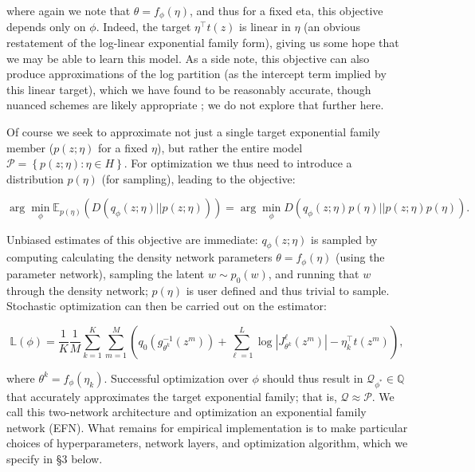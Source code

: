 \documentclass{article}
\begin{document}
where again we note that $\theta = f_\phi(\eta)$, and thus for a fixed eta, this objective depends only on $\phi$.  Indeed, the target $\eta^\top t(z)$ is linear in $\eta$ (an obvious restatement of the log-linear exponential family form), giving us some hope that we may be able to learn this model.  As a side note, this objective can also produce approximations of the log partition (as the intercept term implied by this linear target), which we have found to be reasonably accurate, though nuanced schemes are likely appropriate \cite{papamakarios2015distilling}; we do not explore that further here.

Of course we seek to approximate not just a single target exponential family member ($p(z;\eta)$ for a fixed $\eta$), but rather the entire model $\mathcal{P} = \left\{p(z;\eta): \eta \in H\right\}$.   For optimization we thus need to introduce a distribution $p(\eta)$ (for sampling), leading to the objective: 

$$\arg\!\min_{\!\!\!\!\!\!\!\!\!\!\!\phi} \mathbb{E}_{p(\eta)} \left( D\left( q_\phi(z;\eta) || p(z;\eta) \right)\right) =  \arg\!\min_{\!\!\!\!\!\!\!\!\!\!\!\phi}  D\left( q_\phi(z;\eta)p(\eta) || p(z;\eta)p(\eta) \right).$$

Unbiased estimates of this objective are immediate: $q_\phi(z;\eta)$ is sampled by computing calculating the density network parameters $\theta = f_\phi(\eta)$ (using the parameter network), sampling the latent $w \sim p_0(w)$, and running that $w$ through the density network; $p(\eta)$ is user defined and thus trivial to sample.  Stochastic optimization can then be carried out on the estimator:   

\begin{equation}
\mathbb{L}(\phi) = \frac{1}{K}\frac{1}{M}\sum_{k=1}^K \sum_{m=1}^M \left( q_0\left( g_{\theta^k}^{-1}\left(z^m\right)\right) + \sum_{\ell=1}^L  \log | J^\ell_{\theta^k}\left(z^m\right) | - \eta_k^\top t\left(z^m\right) \right),
\label{eq:obj}
\end{equation}

where $\theta^k = f_\phi\left(\eta_k\right)$.  Successful optimization over $\phi$ should thus result in $\mathcal{Q}_{\phi^*} \in \mathbb{Q}$ that accurately approximates the target exponential family; that is, $\mathcal{Q} \approx \mathcal{P}$.  We call this two-network architecture and optimization an exponential family network (EFN).   What remains for empirical implementation is to make particular choices of hyperparameters, network layers, and optimization algorithm, which we specify in \S3 below.
\end{document}
